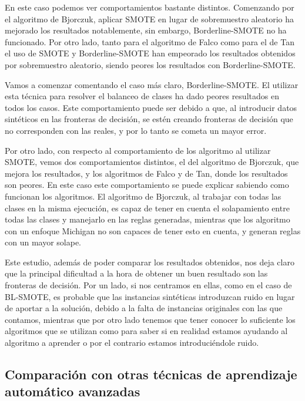 En este caso podemos ver comportamientos bastante distintos. Comenzando por el algoritmo de Bjorczuk, aplicar SMOTE en lugar de sobremuestro aleatorio ha mejorado los resultados notablemente, sin embargo, Borderline-SMOTE no ha funcionado. Por otro lado, tanto para el algoritmo de Falco como para el de Tan el uso de SMOTE y Borderline-SMOTE han empeorado los resultados obtenidos por sobremuestro aleatorio, siendo peores los resultados con Borderline-SMOTE.

Vamos a comenzar comentando el caso más claro, Borderline-SMOTE. El utilizar esta técnica para resolver el balanceo de clases ha dado peores resultados en todos los casos. Este comportamiento puede ser debido a que, al introducir datos sintéticos en las fronteras de decisión, se estén creando fronteras de decisión que no corresponden con las reales, y por lo tanto se cometa un mayor error.

Por otro lado, con respecto al comportamiento de los algoritmo al utilizar SMOTE, vemos dos comportamientos distintos, el del algoritmo de Bjorczuk, que mejora los resultados, y los algoritmos de Falco y de Tan, donde los resultados son peores. En este caso este comportamiento se puede explicar sabiendo como funcionan los algoritmos. El algoritmo de Bjorczuk, al trabajar con todas las clases en la misma ejecución, es capaz de tener en cuenta el solapamiento entre todas las clases y manejarlo en las reglas generadas, mientras que los algoritmo con un enfoque Michigan no son capaces de tener esto en cuenta, y generan reglas con un mayor solape.

Este estudio, además de poder comparar los resultados obtenidos, nos deja claro que la principal dificultad a la hora de obtener un buen resultado son las fronteras de decisión. Por un lado, si nos centramos en ellas, como en el caso de BL-SMOTE, es probable que las instancias sintéticas introduzcan ruido en lugar de aportar a la solución, debido a la falta de instancias originales con las que contamos, mientras que por otro lado tenemos que tener conocer lo suficiente los algoritmos que se utilizan como para saber si en realidad estamos ayudando al algoritmo a aprender o por el contrario estamos introduciéndole ruido.

\newpage

\subsection{Comparación con otras técnicas de aprendizaje automático avanzadas}

